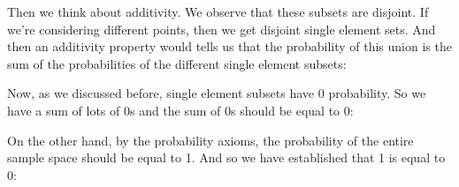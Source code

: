 \documentclass[pdftex, brazil, 12pt, twoside]{article}
\begin{document}
Then we think about additivity.
We observe that these subsets are disjoint.
If we're considering different points, then we get disjoint
single element sets.
And then an additivity property would tells us that
the probability of this union is the sum of the
probabilities of the different single element subsets:

\begin{figure}[H]
  \begin{center}
  \end{center}
\end{figure}

Now, as we discussed before, single element subsets have 0
probability.
So we have a sum of lots of 0s and the sum of 0s should be
equal to 0:

\begin{figure}[H]
  \begin{center}
  \end{center}
\end{figure}

On the other hand, by the probability axioms, the
probability of the entire sample space
should be equal to 1.
And so we have established that 1 is equal to 0:

\begin{figure}[H]
  \begin{center}
  \end{center}
\end{figure}
\end{document}
